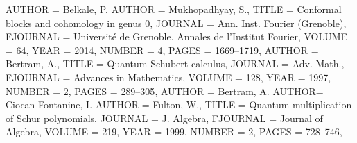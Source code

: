 \begin{bibdiv}
\begin{biblist}
 {
    AUTHOR = {Belkale, P.}
    AUTHOR = {Mukhopadhyay, S.},
     TITLE = {Conformal blocks and cohomology in genus 0},
   JOURNAL = {Ann. Inst. Fourier (Grenoble)},
  FJOURNAL = {Universit\'{e} de Grenoble. Annales de l'Institut Fourier},
    VOLUME = {64},
      YEAR = {2014},
    NUMBER = {4},
     PAGES = {1669--1719},
}
 {
    AUTHOR = {Bertram, A.},
     TITLE = {Quantum {S}chubert calculus},
   JOURNAL = {Adv. Math.},
  FJOURNAL = {Advances in Mathematics},
    VOLUME = {128},
      YEAR = {1997},
    NUMBER = {2},
     PAGES = {289--305},
}
 {
    AUTHOR = {Bertram, A.}
    AUTHOR=  {Ciocan-Fontanine, I.}
    AUTHOR = {Fulton,
              W.},
     TITLE = {Quantum multiplication of {S}chur polynomials},
   JOURNAL = {J. Algebra},
  FJOURNAL = {Journal of Algebra},
    VOLUME = {219},
      YEAR = {1999},
    NUMBER = {2},
     PAGES = {728--746},
}




\end{biblist}
\end{bibdiv}
